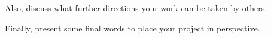 \documentclass[sigconf, anonymous]{acmart}
\def\LaTeX{\textsc{La}\TeX}
\begin{document}
Also, discuss what further directions your work can be taken by
others.

Finally, present some final words to place your project in
perspective.

\balance

\end{document}
